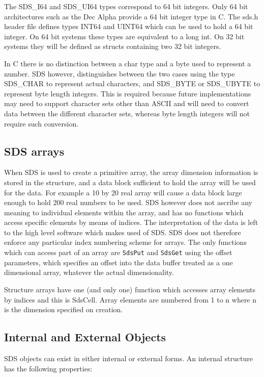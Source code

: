 The SDS\_I64 and SDS\_UI64 types correspond to 64 bit integers. Only 64 bit
architectures such as the Dec Alpha provide a 64 bit integer type in C. The 
sds.h header file defines types INT64 and UINT64 which can be used to hold 
a 64 bit integer. On 64 bit systems these types are equivalent to a long int.
On 32 bit systems they will be defined as structs containing two 32 bit 
integers.

In C there is no distinction between a char type and a byte used to represent a
number. SDS however, distinguishes between the two cases using the type
SDS\_CHAR to represent actual characters, and SDS\_BYTE or SDS\_UBYTE to represent
byte length integers. This is required because future implementations may need
to support character sets other than ASCII and will need to convert data
between the different character sets, whereas byte length integers will not
require such conversion.

\subsection{SDS arrays}

When SDS is used to create a primitive array, the array dimension information
is stored in the structure, and a data block sufficient to hold the array will
be used for the data. For example a 10 by 20 real array will cause a data block
large enough to hold 200 real numbers to be used. SDS however does not ascribe
any meaning to individual elements within the array, and has no functions which 
access specific elements by means of indices. The interpretation of the data is
left to the high level software which makes used of SDS. SDS does not therefore 
enforce any particular index numbering scheme for arrays. The only functions
which can access part of an array are \verb$SdsPut$ and \verb$SdsGet$ using the
offset parameters, which specifies an offset into the data buffer treated as a
one dimensional array, whatever the actual dimensionality.

Structure arrays have one (and only one) function which accesses array elements
by indices and this is SdsCell. Array elements are numbered from 1 to n where
n is the dimension specified on creation. 

\subsection{Internal and External Objects}

SDS objects can exist in either internal or external forms. An internal
structure has the following properties: 

